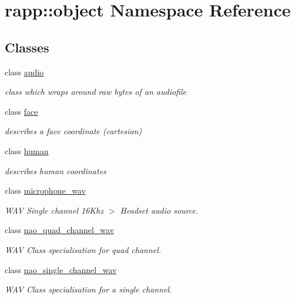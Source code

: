 \hypertarget{namespacerapp_1_1object}{\section{rapp\-:\-:object Namespace Reference}
\label{namespacerapp_1_1object}
}
\subsection*{Classes}
\begin{DoxyCompactItemize}
\item 
class \hyperlink{classrapp_1_1object_1_1audio}{audio}
\begin{DoxyCompactList}\small\item\em class which wraps around raw bytes of an audiofile \end{DoxyCompactList}\item 
class \hyperlink{classrapp_1_1object_1_1face}{face}
\begin{DoxyCompactList}\small\item\em describes a face coordinate (cartesian) \end{DoxyCompactList}\item 
class \hyperlink{classrapp_1_1object_1_1human}{human}
\begin{DoxyCompactList}\small\item\em describes human coordinates \end{DoxyCompactList}\item 
class \hyperlink{classrapp_1_1object_1_1microphone__wav}{microphone\-\_\-wav}
\begin{DoxyCompactList}\small\item\em W\-A\-V Single channel 16\-Khz $>$ Headset audio source. \end{DoxyCompactList}\item 
class \hyperlink{classrapp_1_1object_1_1nao__quad__channel__wav}{nao\-\_\-quad\-\_\-channel\-\_\-wav}
\begin{DoxyCompactList}\small\item\em W\-A\-V Class specialisation for quad channel. \end{DoxyCompactList}\item 
class \hyperlink{classrapp_1_1object_1_1nao__single__channel__wav}{nao\-\_\-single\-\_\-channel\-\_\-wav}
\begin{DoxyCompactList}\small\item\em W\-A\-V Class specialisation for a single channel. \end{DoxyCompactList}\item 

\end{DoxyCompactItemize}
